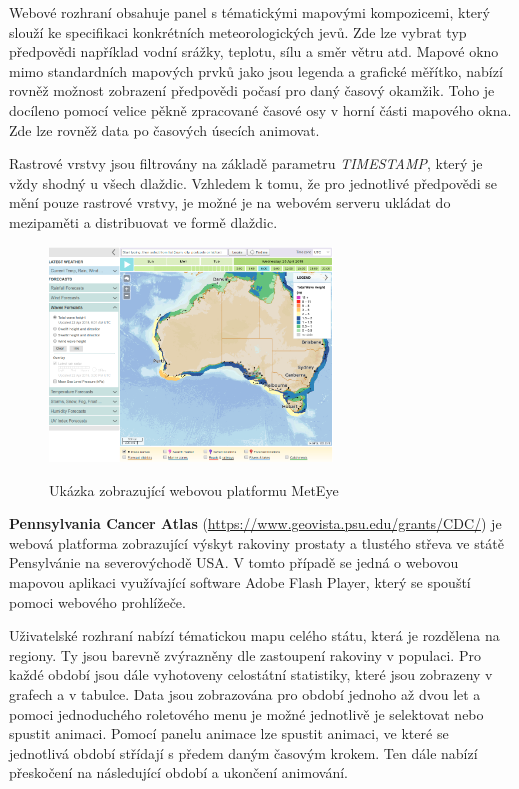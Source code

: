 Webové rozhraní obsahuje panel s tématickými mapovými kompozicemi, 
který slouží ke specifikaci konkrétních meteorologických jevů. 
Zde lze vybrat typ předpovědi 
například vodní srážky, teplotu, sílu a směr větru atd. Mapové okno
mimo standardních mapových prvků jako jsou legenda a grafické měřítko,
nabízí rovněž možnost zobrazení předpovědi počasí pro daný časový
okamžik. Toho je docíleno pomocí velice pěkně zpracované časové osy v
horní části mapového okna. Zde lze rovněž data po časových
úsecích animovat.

Rastrové vrstvy jsou filtrovány na základě parametru
\textit{TIMESTAMP}, který je vždy shodný u všech dlaždic. Vzhledem k
tomu, že pro jednotlivé předpovědi se mění pouze rastrové vrstvy, je
možné je na webovém serveru ukládat do mezipaměti a distribuovat ve formě dlaždic.

\begin{figure}[h!]  \centering
\includegraphics[width=0.67\textwidth]{../img/meteye.png}
	\caption{Ukázka zobrazující webovou platformu MetEye}
	\cite{met-eye}
	\label{fig:met-eye}
\end{figure}

\textbf{Pennsylvania Cancer Atlas}
(\url{https://www.geovista.psu.edu/grants/CDC/}) je webová platforma
zobrazující výskyt rakoviny prostaty a tlustého střeva ve státě
Pensylvánie na severovýchodě USA. V tomto případě se jedná o webovou
mapovou aplikaci využívající software Adobe Flash Player, který se
spouští pomoci webového prohlížeče.

Uživatelské rozhraní nabízí tématickou mapu celého státu, která je
rozdělena na regiony. Ty jsou barevně zvýrazněny dle zastoupení
rakoviny v populaci. Pro každé období jsou dále vyhotoveny celostátní
statistiky, které jsou zobrazeny v grafech a v tabulce. Data jsou
zobrazována pro období jednoho až dvou let a pomoci jednoduchého
roletového menu je možné jednotlivě je selektovat nebo spustit
animaci. Pomocí panelu animace lze spustit animaci, ve které se
jednotlivá období střídají s předem daným časovým krokem. Ten dále
nabízí přeskočení na následující období a ukončení animování.

